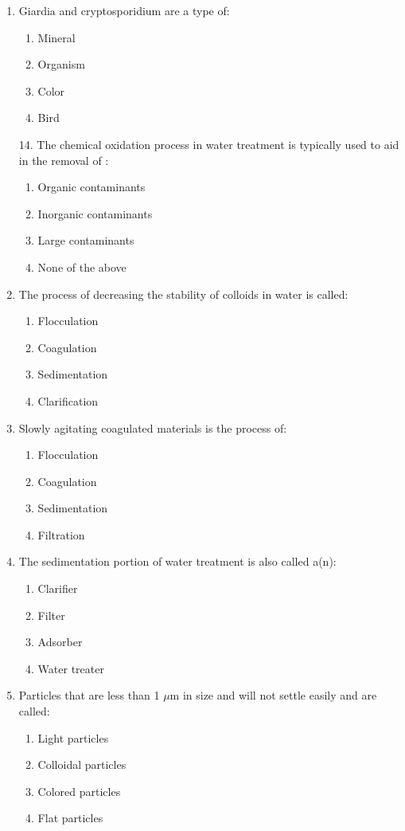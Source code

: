\begin{enumerate}
\item Giardia and cryptosporidium are a type of:
\begin{enumerate}
\item Mineral
\item Organism
\item Color
\item Bird
\end{enumerate}

14. The chemical oxidation process in water treatment is typically used to aid in the
removal of :
\begin{enumerate}
\item Organic contaminants
\item Inorganic contaminants
\item Large contaminants
\item None of the above
\end{enumerate}

\item The process of decreasing the stability of colloids in water is called:
\begin{enumerate}
\item Flocculation
\item Coagulation
\item Sedimentation
\item Clarification
\end{enumerate}

\item Slowly agitating coagulated materials is the process of:
\begin{enumerate}
\item Flocculation
\item Coagulation
\item Sedimentation
\item Filtration
\end{enumerate}

\item The sedimentation portion of water treatment is also called a(n):
\begin{enumerate}
\item Clarifier
\item Filter
\item Adsorber
\item Water treater
\end{enumerate}

\item Particles that are less than 1 $\mu\text{m}$ in size and will not settle easily and are called:
\begin{enumerate}
\item Light particles
\item Colloidal particles
\item Colored particles
\item Flat particles
\end{enumerate}


\end{enumerate}
